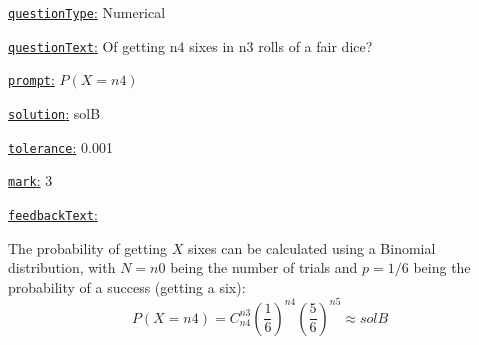 \documentclass[preview]{standalone}
\newcommand \fieldname[1]{\underline{\texttt{#1}:}}
\begin{document}
\fieldname{questionType}
Numerical

\fieldname{questionText}
Of getting {n4} sixes in {n3} rolls of a fair dice?

\fieldname{prompt}
$P(X = {n4})$

\fieldname{solution}
solB

\fieldname{tolerance}
0.001

\fieldname{mark}
3

\fieldname{feedbackText}

The probability of getting $X$ sixes can be calculated using a Binomial distribution, with $N={n0}$ being the number of trials and $p=1/6$ being the probability of a success (getting a six):
\[
P(X = {n4})  = C^{{n3}}_{{n4}}  \left(\frac{1}{6}\right)^{{n4}} \left(\frac{5}{6}\right)^{{n5}} \approx {solB}
\]


\end{document}
